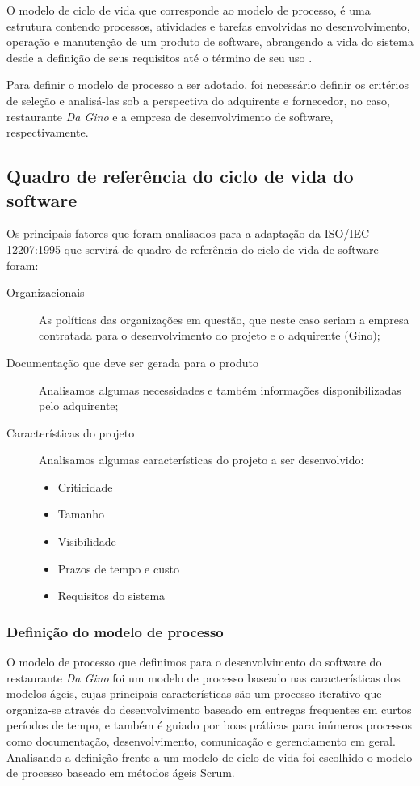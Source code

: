 O modelo de ciclo de vida que corresponde ao modelo de processo, é uma estrutura contendo processos, atividades e tarefas envolvidas no desenvolvimento, operação e manutenção de um produto de software, abrangendo a vida do sistema desde a definição de seus requisitos até o término de seu uso \cite{iso12207:95}.

Para definir o modelo de processo a ser adotado, foi necessário definir os critérios de seleção e analisá-las sob a perspectiva do adquirente e fornecedor, no caso, restaurante \textit{Da Gino} e a empresa de desenvolvimento de software, respectivamente.


\subsection{Quadro de referência do ciclo de vida do software}

Os principais fatores que foram analisados para a adaptação da ISO/IEC 12207:1995 que servirá de quadro de referência do ciclo de vida de software foram:

\begin{description}
  \item [Organizacionais] As políticas das organizações em questão, que neste caso seriam a empresa contratada para o desenvolvimento do projeto e o adquirente (Gino);
  \item [Documentação que deve ser gerada para o produto] Analisamos algumas necessidades e também informações disponibilizadas pelo adquirente;
  \item [Características do projeto] Analisamos algumas características do projeto a ser desenvolvido:
  \begin{itemize}
    \item Criticidade
    \item Tamanho
    \item Visibilidade
    \item Prazos de tempo e custo
    \item Requisitos do sistema
  \end{itemize}

\end{description}

\subsubsection{Definição do modelo de processo}

O modelo de processo que definimos para o desenvolvimento do software do restaurante \textit{Da Gino} foi um modelo de processo baseado nas características dos modelos ágeis, cujas principais características são um processo iterativo que organiza-se através do desenvolvimento baseado em entregas frequentes em curtos períodos de tempo, e também é guiado por boas práticas para inúmeros processos como documentação, desenvolvimento, comunicação e gerenciamento em geral. Analisando a definição frente a um modelo de ciclo de vida foi escolhido o modelo de processo baseado em métodos ágeis Scrum.


